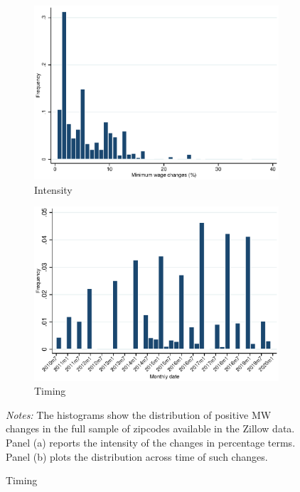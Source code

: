 \begin{figure}[h!]
	\centering
	\caption{Distribution of Minimum Wage changes}
	\label{fig:d_ln_mw_dist}
	\begin{subfigure}{.49\textwidth}
		\caption{Intensity}
		\includegraphics[width = \textwidth]
			{../../analysis/descriptive/output/pct_ch_mw_dist.eps}
	\end{subfigure}
	\begin{subfigure}{.49\textwidth}
		\caption{Timing}
		\includegraphics[width = \textwidth]
			{../../analysis/descriptive/output/pct_ch_mw_date_dist.eps}
	\end{subfigure}
	\begin{minipage}{\textwidth} \footnotesize
		\textit{Notes:} The histograms show the distribution of positive MW changes 
		in the full sample of zipcodes available in the Zillow data. Panel (a) reports 
		the intensity of the changes in percentage terms. Panel (b) plots the distribution 
		across time of such changes. 
	\end{minipage}
\end{figure}

